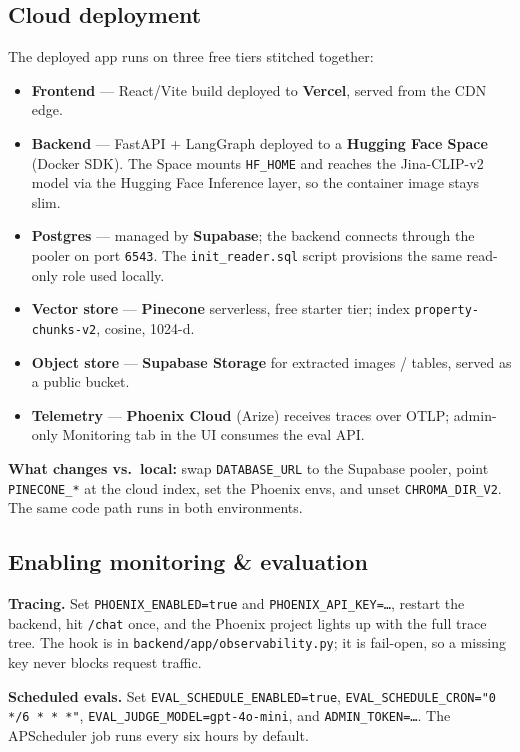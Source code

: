 \documentclass[11pt,a4paper]{article}
\begin{document}
\subsection{Cloud deployment}

The deployed app runs on three free tiers stitched together:

\begin{itemize}
  \item \textbf{Frontend} --- React/Vite build deployed to \textbf{Vercel}, served from the CDN edge.
  \item \textbf{Backend} --- FastAPI + LangGraph deployed to a \textbf{Hugging Face Space} (Docker SDK). The Space mounts \texttt{HF\_HOME} and reaches the Jina-CLIP-v2 model via the Hugging Face Inference layer, so the container image stays slim.
  \item \textbf{Postgres} --- managed by \textbf{Supabase}; the backend connects through the pooler on port \texttt{6543}. The \texttt{init\_reader.sql} script provisions the same read-only role used locally.
  \item \textbf{Vector store} --- \textbf{Pinecone} serverless, free starter tier; index \texttt{property-chunks-v2}, cosine, 1024-d.
  \item \textbf{Object store} --- \textbf{Supabase Storage} for extracted images / tables, served as a public bucket.
  \item \textbf{Telemetry} --- \textbf{Phoenix Cloud} (Arize) receives traces over OTLP; admin-only Monitoring tab in the UI consumes the eval API.
\end{itemize}

\textbf{What changes vs.\ local:} swap \texttt{DATABASE\_URL} to the Supabase pooler, point
\texttt{PINECONE\_*} at the cloud index, set the Phoenix envs, and unset
\texttt{CHROMA\_DIR\_V2}. The same code path runs in both environments.

\subsection{Enabling monitoring \& evaluation}

\textbf{Tracing.} Set \texttt{PHOENIX\_ENABLED=true} and \texttt{PHOENIX\_API\_KEY=\dots},
restart the backend, hit \texttt{/chat} once, and the Phoenix project lights up with the
full trace tree. The hook is in \texttt{backend/app/observability.py}; it is fail-open, so a
missing key never blocks request traffic.

\textbf{Scheduled evals.} Set \texttt{EVAL\_SCHEDULE\_ENABLED=true},
\texttt{EVAL\_SCHEDULE\_CRON="0 */6 * * *"}, \texttt{EVAL\_JUDGE\_MODEL=gpt-4o-mini}, and
\texttt{ADMIN\_TOKEN=\dots}. The APScheduler job runs every six hours by default.
\end{document}
